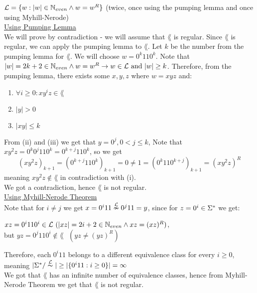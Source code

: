 $\mathcal{L}=\{w : |w| \in \mathbb{N}_{even} \wedge w = w^R\}$
(twice, once using the pumping lemma and once using Myhill-Nerode) \\

\underline{Using Pumping Lemma} \\

We will prove by contradiction - we will assume that $\lang$ is regular.
Since $\lang$ is regular, we can apply the pumping lemma to $\lang$. Let $k$
be the number from the pumping lemma for $\lang$. We will choose $w = 0^k 11 0^k $.
Note that $|w|=2k+2 \in \mathbb{N}_{even} \wedge w=w^R \rightarrow w \in \mathcal{L} \text{ and } |w| \geq k$.
Therefore, from the pumping lemma, there exists some $x, y, z$ where $w = xyz$ and:

\begin{enumerate}
    \item $\forall i \geq 0: x y^i z \in \lang$
    \item $|y| > 0$
    \item $|xy| \leq k$
\end{enumerate}

From (ii) and (iii) we get that $y=0^j, 0 < j \leq k$,
Note that $x y^2 z = 0^k 0^j 11 0^k = 0^{k+j} 11 0^k$,
so we get
\[
    (x y^2 z)_{k+1} = (0^{k+j} 11 0^k)_{k+1} = 0 \neq
    1 = (0^k 11 0^{k+j})_{k+1} = (x y^2 z)^R
\]
meaning $x y^2 z \notin \lang$ in contradiction with (i). \\
We got a contradiction, hence $\lang$ is not regular. \\

\underline{Using Myhill-Nerode Theorem} \\

Note that for $i \neq j$ we get $x = 0^i 11 \overset{\mathcal{L}}{\nsim} 0^j 11 = y$,
since for $z=0^i \in \Sigma^*$ we get:

$xz = 0^i 11 0^i \in \mathcal{L} \text{ } (|xz|=2i+2 \in \mathbb{N}_{even} \wedge xz=(xz)^R)$, \\
but $yz = 0^j 11 0^i \notin \lang \text{ } (yz \neq (yz)^R)$

Therefore, each $ 0^i 11 $ belongs to a different equivalence class for every $i \geq 0$, \\
meaning $|\Sigma^* / \overset{\mathcal{L}}{\thicksim}| \geq |\{0^i 11: i \geq 0\}| = \infty$ \\
We got that $\lang$ has an infinite number of equivalence classes, hence from
Myhill-Nerode Theorem we get that $\lang$ is not regular. \\
